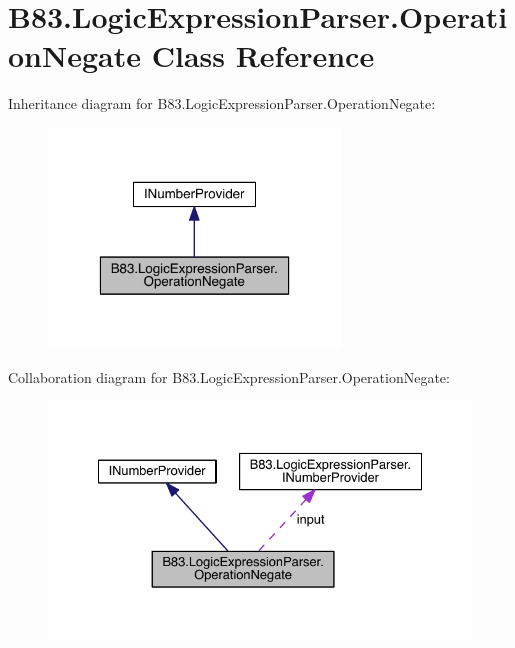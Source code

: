 \hypertarget{class_b83_1_1_logic_expression_parser_1_1_operation_negate}{}\section{B83.\+Logic\+Expression\+Parser.\+Operation\+Negate Class Reference}
\label{class_b83_1_1_logic_expression_parser_1_1_operation_negate}


Inheritance diagram for B83.\+Logic\+Expression\+Parser.\+Operation\+Negate\+:\nopagebreak
\begin{figure}[H]
\begin{center}
\leavevmode
\includegraphics[width=220pt]{class_b83_1_1_logic_expression_parser_1_1_operation_negate__inherit__graph}
\end{center}
\end{figure}


Collaboration diagram for B83.\+Logic\+Expression\+Parser.\+Operation\+Negate\+:\nopagebreak
\begin{figure}[H]
\begin{center}
\leavevmode
\includegraphics[width=330pt]{class_b83_1_1_logic_expression_parser_1_1_operation_negate__coll__graph}
\end{center}
\end{figure}
